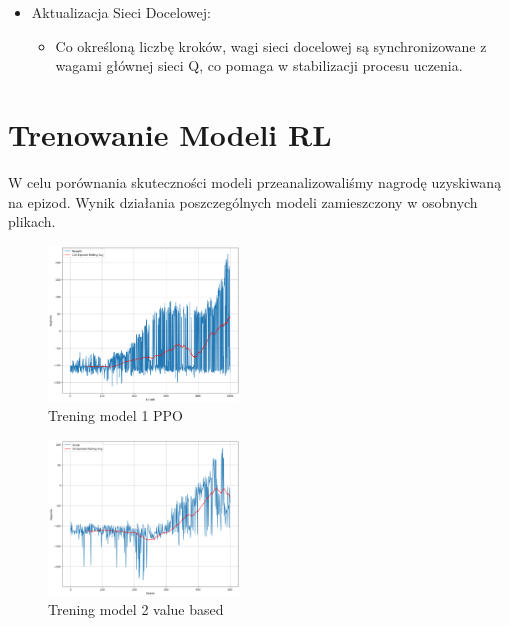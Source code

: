 \documentclass[conference]{IEEEtran}
\begin{document}
\begin{itemize}
    \item Aktualizacja Sieci Docelowej:
    \begin{itemize}
        \item Co określoną liczbę kroków, wagi sieci docelowej są synchronizowane z wagami głównej sieci Q, co pomaga w stabilizacji procesu uczenia.
    \end{itemize}

\end{itemize}









\section{Trenowanie Modeli RL}
W celu porównania skuteczności modeli przeanalizowaliśmy nagrodę uzyskiwaną na epizod. Wynik działania poszczególnych modeli zamieszczony w osobnych plikach.


\begin{figure}[htbp]
    \centering
    \includegraphics[width=0.45\textwidth]{image2.png}
    \caption{Trening model 1 PPO}
    \label{fig:ppo}
\end{figure}


\begin{figure}[htbp]
    \centering
    \includegraphics[width=0.45\textwidth]{image3.png}
    \caption{Trening model 2 value based}
    \label{fig:dqn}
\end{figure}
\end{document}
